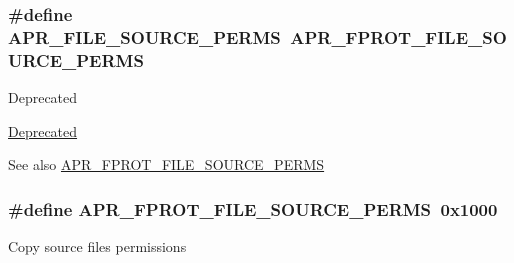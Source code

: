 \subsubsection[{\texorpdfstring{A\+P\+R\+\_\+\+F\+I\+L\+E\+\_\+\+S\+O\+U\+R\+C\+E\+\_\+\+P\+E\+R\+MS}{APR_FILE_SOURCE_PERMS}}]{\setlength{\rightskip}{0pt plus 5cm}\#define A\+P\+R\+\_\+\+F\+I\+L\+E\+\_\+\+S\+O\+U\+R\+C\+E\+\_\+\+P\+E\+R\+MS~{\bf A\+P\+R\+\_\+\+F\+P\+R\+O\+T\+\_\+\+F\+I\+L\+E\+\_\+\+S\+O\+U\+R\+C\+E\+\_\+\+P\+E\+R\+MS}}\hypertarget{group__apr__file__permissions_gaa72c8bc4ab1bd5615bee4333d23dc16b}{}\label{group__apr__file__permissions_gaa72c8bc4ab1bd5615bee4333d23dc16b}
\begin{DoxyRefDesc}{Deprecated}
\item[\hyperlink{deprecated__deprecated000023}{Deprecated}]\end{DoxyRefDesc}
\begin{DoxySeeAlso}{See also}
\hyperlink{group__apr__file__permissions_gac08d4e868c7c9532f7c97c70556663dc}{A\+P\+R\+\_\+\+F\+P\+R\+O\+T\+\_\+\+F\+I\+L\+E\+\_\+\+S\+O\+U\+R\+C\+E\+\_\+\+P\+E\+R\+MS} 
\end{DoxySeeAlso}
\subsubsection[{\texorpdfstring{A\+P\+R\+\_\+\+F\+P\+R\+O\+T\+\_\+\+F\+I\+L\+E\+\_\+\+S\+O\+U\+R\+C\+E\+\_\+\+P\+E\+R\+MS}{APR_FPROT_FILE_SOURCE_PERMS}}]{\setlength{\rightskip}{0pt plus 5cm}\#define A\+P\+R\+\_\+\+F\+P\+R\+O\+T\+\_\+\+F\+I\+L\+E\+\_\+\+S\+O\+U\+R\+C\+E\+\_\+\+P\+E\+R\+MS~0x1000}\hypertarget{group__apr__file__permissions_gac08d4e868c7c9532f7c97c70556663dc}{}\label{group__apr__file__permissions_gac08d4e868c7c9532f7c97c70556663dc}
Copy source file\textquotesingle{}s permissions 
